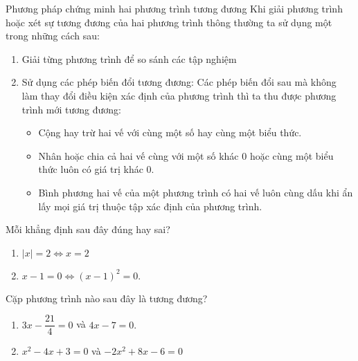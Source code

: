 \begin{dang}{Phương pháp chứng minh hai phương trình tương đương}
Khi giải phương trình hoặc xét sự tương đương của hai phương trình thông thường ta sử dụng một trong những cách sau: \par
\begin{enumerate}
	\item Giải từng phương trình để so sánh các tập nghiệm
	\item Sử dụng các phép biến đổi tương đương: Các phép biến đổi sau mà không làm thay đổi điều kiện xác định của phương trình thì ta thu được phương trình mới tương đương: 
	\begin{itemize}
		\item Cộng hay trừ hai vế với cùng một số hay cùng một biểu thức.
		\item Nhân hoặc chia cả hai vế cùng với một số khác $0$ hoặc cùng một biểu thức luôn có giá trị khác $0$.
		\item Bình phương hai vế của một phương trình có hai vế luôn cùng dấu khi ẩn lấy mọi giá trị thuộc tập xác định của phương trình.
	\end{itemize}
\end{enumerate}
\end{dang}
\begin{vd}%
Mỗi khẳng định sau đây đúng hay sai?
\begin{enumerate}
\item $\left|x\right|=2\Leftrightarrow x=2$
\item $x-1=0\Leftrightarrow \left(x-1\right)^2=0.$
\end{enumerate}
\end{vd}
\begin{vd}%
Cặp phương trình nào sau đây là tương đương? 
\begin{enumerate}
\item $3x-\dfrac{21}{4}=0$ và $4x-7=0.$
\item $x^2-4x+3=0$ và $-2x^2+8x-6=0$
\end{enumerate}
\end{vd}
